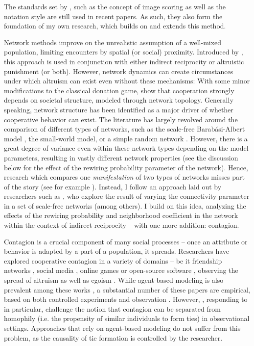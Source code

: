 \documentclass{JASSS}
\begin{document}
The standards set by \cite{Nowak1998}, such as the concept of image scoring as well as the notation style are still used in recent papers. As such, they also form the foundation of my own research, which builds on and extends this method.

Network methods improve on the unrealistic assumption of a well-mixed population, limiting encounters by spatial (or social) proximity. Introduced by \cite{Kearns2001}, this approach is used in conjunction with either indirect reciprocity or altruistic punishment (or both). However, network dynamics can create circumstances under which altruism can exist even without these mechanisms: With some minor modifications to the classical donation game, \citep{Santos2008} show that cooperation strongly depends on societal structure, modeled through network topology. Generally speaking, network structure has been identified as a major driver of whether cooperative behavior can exist. The literature has largely revolved around the comparison of different types of networks, such as the scale-free Barab\'{a}si-Albert model \citep{barabasi1999,Santos2005,Wu2005}, the small-world \cite{Watts1998} model, or a simple random network \citep{Erdos1960}. However, there is a great degree of variance even within these network types depending on the model parameters, resulting in vastly different network properties (see the discussion below for the effect of the rewiring probability parameter of the \cite{Watts1998} network). Hence, research which compares one \textit{manifestation} of two types of networks misses part of the story (see for example \cite{Salazar2011,Peleteiro2014,Shutters2015}). Instead, I follow an approach laid out by researchers such as \cite{Santos2006}, who explore the result of varying the connectivity parameter in a set of scale-free networks (among others). I build on this idea, analyzing the effects of the rewiring probability and neighborhood coefficient in the \cite{Watts1998} network within the context of indirect reciprocity -- with one more addition: contagion.

Contagion is a crucial component of many social processes -- once an attribute or behavior is adapted by a part of a population, it spreads. Researchers have explored cooperative contagion in a variety of domains -- be it friendship networks \citep{Christakis2007}, social media \citep{Centola2010,Bond2012,Rand2015}, online games \citep{Kang2015} or open-source software \citep{Khalak2003}, observing the spread of altruism \citep{Tsvetkova2014} as well as egoism \citep{Ito2016}. While agent-based modeling is also prevalent among these works \citep{Khalak2003, Rand2015}, a substantial number of these papers are empirical, based on both controlled experiments \citep{Centola2010,Tsvetkova2014, Ito2016} and observation \citep{Bond2012,Kang2015}. However, \cite{Shalizi2011}, responding to \cite{Christakis2007} in particular, challenge the notion that contagion can be separated from homophily (i.e. the propensity of similar individuals to form ties) in observational settings. Approaches that rely on agent-based modeling do not suffer from this problem, as the causality of tie formation is controlled by the researcher.
\end{document}
